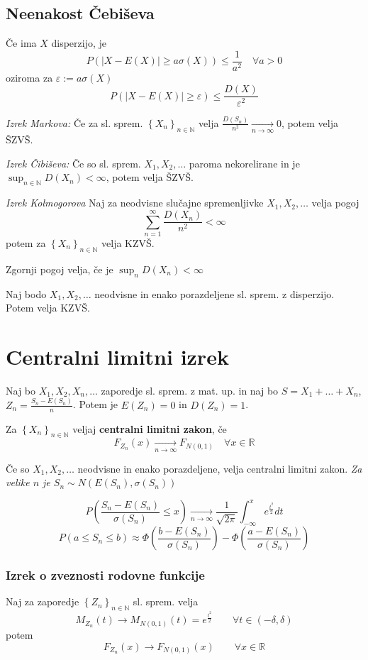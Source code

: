 \begin{multicols}{5}
\subsection{Neenakost Čebiševa}
Če ima $X$ disperzijo, je
\[ P(|X - E(X)| \geq a \sigma(X)) \leq \frac{1}{a^2}  \quad \forall a > 0\]
oziroma za $\varepsilon := a \sigma(X)$
\[ P(|X-E(X)| \geq \varepsilon) \leq \frac{D(X)}{\varepsilon^2}\]

\textit{Izrek Markova:}
Če za sl. sprem. $\left\{ X_n \right\}_{n \in \mathbb{N}} $ velja $\frac{D(S_n)}{n^2} \xrightarrow[n \to \infty]{} 0$, potem velja ŠZVŠ.

\textit{Izrek Čibiševa:}
Če so sl. sprem. $ X_1, X_2, \dots $ paroma nekorelirane in je $\sup_{n \in \mathbb{N}} D(X_n) < \infty$, potem velja ŠZVŠ.

\textit{Izrek Kolmogorova}
Naj za neodvisne slučajne spremenljivke $X_1, X_2, \dots$ velja pogoj
\[ \sum_{n=1}^\infty \frac{D(X_n)}{n^2} < \infty\]
potem za  $\left\{ X_n \right\}_{n \in \mathbb{N}} $ velja KZVŠ.

Zgornji pogoj velja, če je $\sup_n D(X_n) < \infty$

Naj bodo  $X_1, X_2, \dots$ neodvisne in enako porazdeljene sl. sprem. z disperzijo. Potem velja KZVŠ.

\section{Centralni limitni izrek}
Naj bo $X_1, X_2, X_n, \dots$ zaporedje sl. sprem. z mat. up. in naj bo $S = X_1 +\dots + X_n$, $Z_n = \frac{S_n - E(S_n)}{n}$. Potem je $E(Z_n) = 0$ in $D(Z_n) = 1$.

Za $\left\{ X_n \right\}_{n \in \mathbb{N}} $ veljaj \textbf{centralni limitni zakon}, če
\[ F_{Z_n}(x) \xrightarrow[n \to \infty]{} F_{N(0,1)}  \quad \forall x \in \mathbb{R}\]

Če so $X_1, X_2, \dots$ neodvisne in enako porazdeljene, velja centralni limitni zakon.
\textit{Za velike $n$ je $S_n \sim N(E(S_n), \sigma(S_n))$}

\[ P\left(\frac{S_n - E(S_n)}{\sigma(S_n)} \leq x \right) \xrightarrow[n \to \infty]{} \frac{1}{\sqrt{2\pi}} \int_{-\infty}^{x} e^{\frac{t^2}{2}} dt\]
\[ P(a \leq S_n \leq b) \approx \Phi\left(\frac{b-E(S_n)}{\sigma(S_n)}\right) - \Phi\left(\frac{a-E(S_n)}{\sigma(S_n)}\right)  \]


\subsubsection{Izrek o zveznosti rodovne funkcije}

Naj za zaporedje $\left\{ Z_n \right\}_{n \in \mathbb{N}} $ sl. sprem. velja
\[ M_{Z_n}(t) \to M_{N(0,1)}(t) = e^{\frac{t^2}{2}} \qquad \forall t \in (-\delta, \delta)\]
potem
\[ F_{Z_n}(x) \to F_{N(0,1)}(x)  \qquad \forall x \in \mathbb{R}\]
\end{multicols}
